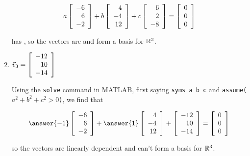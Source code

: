 \documentclass{ximera}
\begin{document}
\begin{exercise}
\begin{enumerate}
\begin{problem}
        \begin{equation*}
        a\startmat{r} -6 \\ 6 \\ -2\stopmat + b\startmat{r} 4 \\ -4 \\ 12\stopmat + c\startmat{r} 6 \\ 2 \\ -8\stopmat = \startmat{r} 0 \\ 0 \\ 0\stopmat
        \end{equation*}

        has , so the vectors are  and  form a basis for $\R^3$.

    \end{problem}

    \item $\vect{v}_3 = \startmat{r} -12 \\ 10 \\ -14\stopmat$
    
    \begin{problem}
    
        Using the \texttt{solve} command in MATLAB, first saying \texttt{syms a b c} and \texttt{assume($a^2+b^2+c^2>0$)}, we find that

        \begin{equation*}
        \answer{-1}\startmat{r} -6 \\ 6 \\ -2\stopmat + \answer{1}\startmat{r} 4 \\ -4 \\ 12\stopmat + \startmat{r} -12 \\ 10 \\ -14\stopmat = \startmat{r} 0 \\ 0 \\ 0\stopmat
        \end{equation*}

        so the vectors are linearly dependent and can't form a basis for $\R^3$.

    \end{problem}
    \end{enumerate}

\end{exercise}
\end{document}
